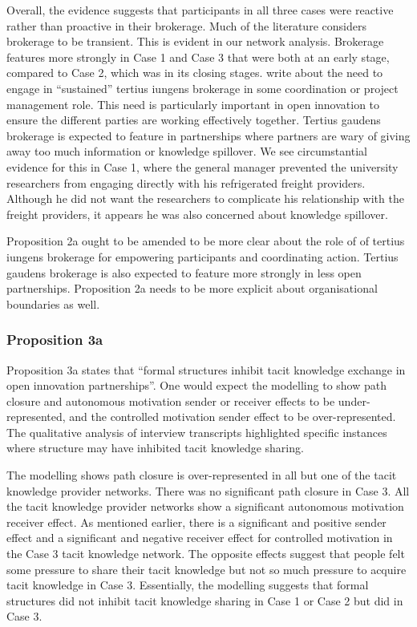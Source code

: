 Overall, the evidence suggests that participants in all three cases were reactive rather than proactive in their brokerage. Much of the literature considers brokerage to be transient. This is evident in our network analysis. Brokerage features more strongly in Case 1 and Case 3 that were both at an early stage, compared to Case 2, which was in its closing stages. \citet{grosser2019measuring} write about the need to engage in \enquote{sustained} tertius iungens brokerage in some coordination or project management role. This need is particularly important in open innovation to ensure the different parties are working effectively together. Tertius gaudens brokerage is expected to feature in partnerships where partners are wary of giving away too much information or knowledge spillover. We see circumstantial evidence for this in Case 1, where the general manager prevented the university researchers from engaging directly with his refrigerated freight providers. Although he did not want the researchers to complicate his relationship with the freight providers, it appears he was also concerned about knowledge spillover. \medskip

Proposition 2a ought to be amended to be more clear about the role of of tertius iungens brokerage for empowering participants and coordinating action. Tertius gaudens brokerage is also expected to feature more strongly in less open partnerships. Proposition 2a needs to be more explicit about organisational boundaries as well. 

\subsubsection{Proposition 3a}

Proposition 3a states that \enquote{formal structures inhibit tacit knowledge exchange in open innovation partnerships}. One would expect the modelling to show path closure and autonomous motivation sender or receiver effects to be under-represented, and the controlled motivation sender effect to be over-represented. The qualitative analysis of interview transcripts highlighted specific instances where structure may have inhibited tacit knowledge sharing. \medskip

The modelling shows path closure is over-represented in all but one of the tacit knowledge provider networks. There was no significant path closure in Case 3. All the tacit knowledge provider networks show a significant autonomous motivation receiver effect. As mentioned earlier, there is a significant and positive sender effect and a significant and negative receiver effect for controlled motivation in the Case 3 tacit knowledge network. The opposite effects suggest that people felt some pressure to share their tacit knowledge but not so much pressure to acquire tacit knowledge in Case 3. Essentially, the modelling suggests that formal structures did not inhibit tacit knowledge sharing in Case 1 or Case 2 but did in Case 3. \medskip

